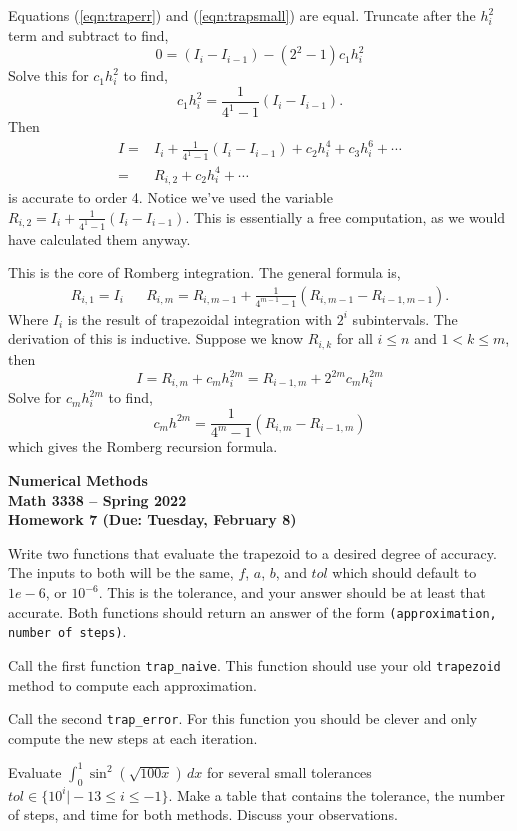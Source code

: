 \documentclass[11pt,letterpaper]{article}
\newcommand{\semester}{Spring 2022}
\newcommand{\due}{Tuesday, February 8}
\begin{document}
Equations (\ref{eqn:traperr}) and (\ref{eqn:trapsmall}) are equal. Truncate after the $h_i^2$ term
and subtract to find,
\begin{equation*}
 0 = (I_i-I_{i-1}) - (2^2-1)c_1h_i^2
\end{equation*}
Solve this for $c_1h_i^2$ to find,
\[
 c_1h_i^2 = \frac{1}{4^1-1}(I_i-I_{i-1}).
\]
Then
\begin{align*}
I = & I_i +\frac{1}{4^1-1}(I_i-I_{i-1}) + c_2h_i^4 + c_3h_i^6+\cdots \\
  = & R_{i,2} + c_2h_i^4+\cdots
\end{align*}
is accurate to order 4. Notice we've used the variable $R_{i,2} = I_i + \frac{1}{4^1-1}(I_i-I_{i-1})$. This is essentially a free computation, as we would have calculated them
anyway. 

This is the core of Romberg integration. The general formula is,
\begin{align*}
R_{i,1} = I_i && R_{i,m} = R_{i,m-1} + \frac{1}{4^{m-1}-1}(R_{i,m-1}-R_{i-1,m-1}).
\end{align*}
Where $I_i$ is the result of trapezoidal integration with $2^i$ subintervals. The derivation of this is inductive. Suppose we know $R_{i,k}$ for all $i\le n$ and $1<k\le m$,
then
\begin{equation*}
I = R_{i,m} + c_m h_i^{2m} = R_{i-1,m} + 2^{2m}c_mh_i^{2m}
\end{equation*}
Solve for $c_mh_i^{2m}$ to find,
\[
 c_mh^{2m} = \frac{1}{4^m-1}(R_{i,m}-R_{i-1,m})
\]
which gives the Romberg recursion formula.

\newpage

\begin{center}
{\huge{\bf  Numerical Methods}} \\[1.5ex]
{\bf Math 3338 -- \semester}\\[1.5ex]
{\Large{\bf Homework 7 (Due: \due)}}\\
\end{center}
\vspace{2mm}



\begin{problem}
 Write two functions that evaluate the trapezoid to a desired degree of accuracy. The inputs
to both will be the same, $f$, $a$, $b$, and $tol$ which should default to $1e-6$, or $10^{-6}$. 
This is the tolerance, and your answer should be at least that accurate. Both functions should return
an answer of the form \texttt{(approximation, number of steps)}.

Call the first function \texttt{trap\_naive}. This function should use your old \texttt{trapezoid}
method to compute each approximation. 

Call the second \texttt{trap\_error}. For this function you should be clever and only compute the
new steps at each iteration.

Evaluate $\int_0^1 \sin^2(\sqrt{100x})\,dx$ for several small tolerances 
$tol\in\{10^i\vert -13\le i\le -1\}$. Make a table that contains the tolerance, the number of steps, 
and time for both methods. Discuss  your observations. 
\end{problem}
\end{document}
